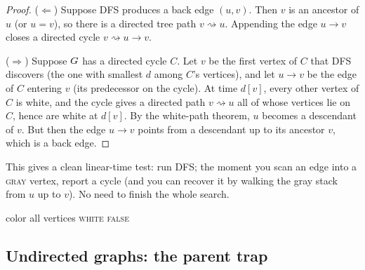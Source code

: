 \begin{proof}
($\Leftarrow$) Suppose DFS produces a back edge $(u,v)$. Then $v$ is an ancestor of $u$ (or $u=v$), so there is a directed tree path $v\rightsquigarrow u$. Appending the edge $u\to v$ closes a directed cycle $v\rightsquigarrow u\to v$.

($\Rightarrow$) Suppose $G$ has a directed cycle $C$. Let $v$ be the first vertex of $C$ that DFS discovers (the one with smallest $d$ among $C$'s vertices), and let $u\to v$ be the edge of $C$ entering $v$ (its predecessor on the cycle). At time $d[v]$, every other vertex of $C$ is white, and the cycle gives a directed path $v\rightsquigarrow u$ all of whose vertices lie on $C$, hence are white at $d[v]$. By the white-path theorem, $u$ becomes a descendant of $v$. But then the edge $u\to v$ points from a descendant up to its ancestor $v$, which is a back edge.
\end{proof}

This gives a clean linear-time test: run DFS; the moment you scan an edge into a \textsc{gray} vertex, report a cycle (and you can recover it by walking the gray stack from $u$ up to $v$). No need to finish the whole search.

\begin{algorithm}[H]
\DontPrintSemicolon
{}
\BlankLine
color all vertices \textsc{white}\;
\Return \textsc{false}\;
\BlankLine
{}
\caption{Directed cycle detection via gray vertices}
\label{ch03:alg-dircycle}
\end{algorithm}

\subsection{Undirected graphs: the parent trap}

